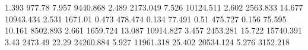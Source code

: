 1.393      977.78     %
7.957      9440.868   %
2.489      2173.049   %
7.526      10124.511  %
2.602      2563.833   %
14.677     10943.434  %
2.531      1671.01    %
0.473      478.474    %
0.134      77.491     %
0.51       475.727    %
0.156      75.595     %
10.161     8502.893   %
2.661      1659.724   %
13.087     10914.827  %
3.457      2453.281   %
15.722     15740.391  %
3.43       2473.49    %
22.29      24260.884  %
5.927      11961.318  %
25.402     20534.124  %
5.276      3152.218   %
